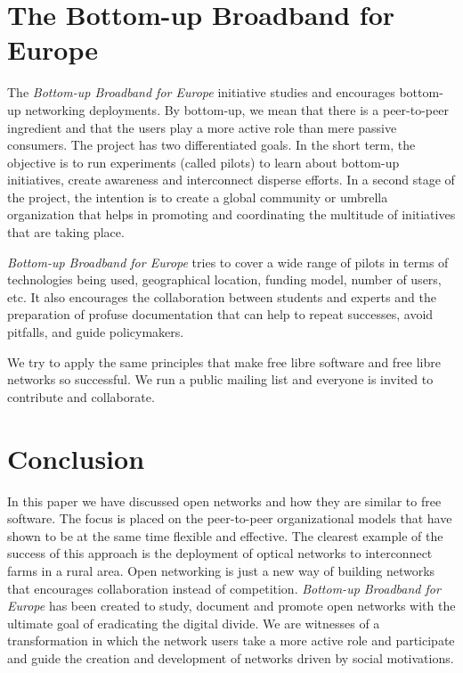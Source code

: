 \documentclass[journal]{IEEEtran}
\begin{document}


\section{The Bottom-up Broadband for Europe}

The \emph{Bottom-up Broadband for Europe} initiative studies and encourages bottom-up networking deployments.
By bottom-up, we mean that there is a peer-to-peer ingredient and that the users play a more active role than mere passive consumers.
The project has two differentiated goals.
In the short term, the objective is to run experiments (called pilots) to learn about bottom-up initiatives, create awareness and interconnect disperse efforts.
In a second stage of the project, the intention is to create a global community or umbrella organization that helps in promoting and coordinating the multitude of initiatives that are taking place.

\emph{Bottom-up Broadband for Europe} tries to cover a wide range of pilots in terms of technologies being used, geographical location, funding model, number of users, etc.
It also encourages the collaboration between students and experts and the preparation of profuse documentation that can help to repeat successes, avoid pitfalls, and guide policymakers.

We try to apply the same principles that make free libre software and free libre networks so successful.
We run a public mailing list and everyone is invited to contribute and collaborate.

\section{Conclusion} \label{sec:conclusion}

In this paper we have discussed open networks and how they are similar to free software.
The focus is placed on the peer-to-peer organizational models that have shown to be at the same time flexible and effective.
The clearest example of the success of this approach is the deployment of optical networks to interconnect farms in a rural area.
Open networking is just a new way of building networks that encourages collaboration instead of competition.
\emph{Bottom-up Broadband for Europe} has been created to study, document and promote open networks with the ultimate goal of eradicating the digital divide.
We are witnesses of a transformation in which the network users take a more active role and participate and guide the creation and development of networks driven by social motivations.
\end{document}
